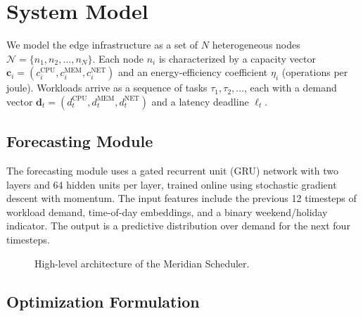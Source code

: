 \section{System Model}

We model the edge infrastructure as a set of \(N\) heterogeneous nodes
\(\mathcal{N} = \{n_1, n_2, \dots, n_N\}\). Each node \(n_i\) is characterized
by a capacity vector \(\mathbf{c}_i = (c_i^{\text{CPU}}, c_i^{\text{MEM}},
c_i^{\text{NET}})\) and an energy-efficiency coefficient \(\eta_i\) (operations
per joule). Workloads arrive as a sequence of tasks \(\tau_1, \tau_2, \dots\),
each with a demand vector \(\mathbf{d}_t = (d_t^{\text{CPU}}, d_t^{\text{MEM}},
d_t^{\text{NET}})\) and a latency deadline \(\ell_t\).

\subsection{Forecasting Module}

The forecasting module uses a gated recurrent unit (GRU) network with two
layers and 64 hidden units per layer, trained online using stochastic gradient
descent with momentum. The input features include the previous 12 timesteps of
workload demand, time-of-day embeddings, and a binary weekend/holiday indicator.
The output is a predictive distribution over demand for the next four timesteps.

\begin{figure}[htbp]
\centering
\singlespacing
{}
\caption{High-level architecture of the Meridian Scheduler.}
\label{fig:meridian}
\end{figure}

\subsection{Optimization Formulation}

